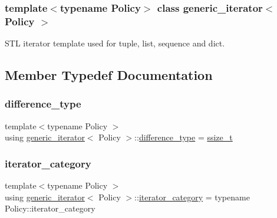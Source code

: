 \subsubsection*{template$<$typename Policy$>$\newline
class generic\+\_\+iterator$<$ Policy $>$}

S\+TL iterator template used for tuple, list, sequence and dict. 

\subsection{Member Typedef Documentation}
\mbox{\label{classgeneric__iterator_a307cd6eddc16127eb873d76bcfc07233}} 
\subsubsection{\texorpdfstring{difference\_type}{difference\_type}}
{\footnotesize\ttfamily template$<$typename Policy $>$ \\
using \mbox{\hyperlink{classgeneric__iterator}{generic\+\_\+iterator}}$<$ Policy $>$\+::\mbox{\hyperlink{classgeneric__iterator_a307cd6eddc16127eb873d76bcfc07233}{difference\+\_\+type}} =  \mbox{\hyperlink{detail_2common_8h_ac430d16fc097b3bf0a7469cfd09decda}{ssize\+\_\+t}}}

\mbox{\label{classgeneric__iterator_a49d278e5bd704d850843005e61b62883}} 
\subsubsection{\texorpdfstring{iterator\_category}{iterator\_category}}
{\footnotesize\ttfamily template$<$typename Policy $>$ \\
using \mbox{\hyperlink{classgeneric__iterator}{generic\+\_\+iterator}}$<$ Policy $>$\+::\mbox{\hyperlink{classgeneric__iterator_a49d278e5bd704d850843005e61b62883}{iterator\+\_\+category}} =  typename Policy\+::iterator\+\_\+category}

